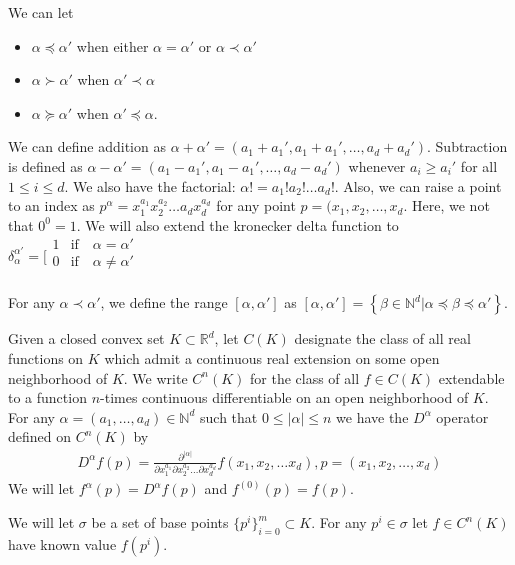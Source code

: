 \documentclass{article}
\theoremstyle{case}
\newcommand{\naturals}{\mathbb N}
\newcommand{\natsd}{\naturals^d}
\begin{document}
We can let 
\begin{itemize}
\item $\alpha \preceq \alpha'$ when either $\alpha = \alpha'$ or $\alpha \prec \alpha'$
\item $\alpha \succ \alpha'$ when $\alpha' \prec \alpha$
\item $\alpha \succeq \alpha'$ when $\alpha' \preceq \alpha$.
\end{itemize}

We can define addition as
$\alpha + \alpha' = (a_1 + a_1', a_1 + a_1', \ldots, a_d + a_d')$.
Subtraction is defined as
$\alpha - \alpha' = (a_1 - a_1', a_1 - a_1', \ldots, a_d - a_d')$
whenever $a_i \ge a_i'$ for all $1 \le i \le d$.
We also have the factorial:
$\alpha! = a_1!a_2!\ldots a_d!$.
Also, we can raise a point to an index as
$p^{\alpha} = x_1^{a_1}x_2^{a_2}\ldots a_dx_d^{a_d}$
for any point $p = (x_1, x_2, \ldots, x_d$.
Here, we not that $0^0 = 1$.
We will also extend the kronecker delta function to $\delta_{\alpha}^{\alpha'} = 
\bigg[
\begin{matrix}
1 & \textrm{if}\quad \alpha = \alpha' \\
0 & \textrm{if}\quad \alpha \ne \alpha' \\
\end{matrix}
$

For any $\alpha \prec \alpha'$, we define the range $[\alpha, \alpha']$ as $[\alpha, \alpha'] = \left\{ \beta \in \natsd | \alpha \preceq \beta \preceq \alpha'  \right\}$.

Given a closed convex set $K \subset \mathbb R^d$, let $C(K)$ designate the class of all real functions on $K$ which admit a continuous real extension on some open neighborhood of $K$.
We write $C^n(K)$ for the class of all $f \in C(K)$ extendable to a function $n$-times continuous differentiable on an open neighborhood of $K$.
For any $\alpha = (a_1, \ldots, a_d) \in \natsd$ such that $0 \le |\alpha| \le n$
we have the $D^{\alpha}$ operator defined on $C^n(K)$ by 
\begin{align*}
D^{\alpha} f(p) = \frac{\partial^{|\alpha|}}{\partial x_1^{a_1}\partial x_2^{a_2}\ldots\partial x_d^{a_d} } f(x_1, x_2, \ldots x_d), p = (x_1, x_2, \ldots, x_d)
\end{align*}
We will let $f^{\alpha}(p) = D^{\alpha} f(p)$ and $f^{(0)}(p) = f(p)$.

We will let $\sigma$ be a set of base points $\{p^i\}_{i=0}^m \subset K$.
For any $p^i \in \sigma$ let $f \in C^n(K)$ have known value $f(p^i)$.
\end{document}
